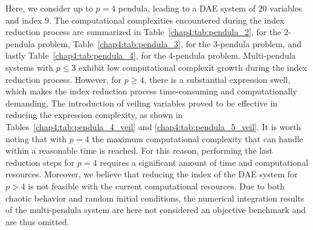 Here, we consider up to $p = 4$ pendula, leading to a \ac{DAE} system of $20$ variables and index $9$. The computational complexities encountered during the index reduction process are summarized in Table~\ref{chap4:tab:pendula_2}, for the 2-pendula problem, Table~\ref{chap4:tab:pendula_3}, for the 3-pendula problem, and lastly Table~\ref{chap4:tab:pendula_4}, for the 4-pendula problem. Multi-pendula systems with $p \leq 3$ exhibit low computational complexit growth during the index reduction process. However, for $p \geq 4$, there is a substantial expression swell, which makes the index reduction process time-consuming and computationally demanding. The introduction of veiling variables proved to be effective in reducing the expression complexity, as shown in Tables~\ref{chap4:tab:pendula_4_veil} and \ref{chap4:tab:pendula_5_veil}. It is worth noting that with $p = 4$ the maximum computational complexity that \Maple{} can handle within a reasonable time is reached. For this reason, performing the last reduction steps for $p = 4$ requires a significant amount of time and computational resources. Moreover, we believe that reducing the index of the \ac{DAE} system for $p > 4$ is not feasible with the current computational resources. Due to both chaotic behavior and random initial conditions, the numerical integration results of the multi-pendula system are here not considered an objective benchmark and are thus omitted.


